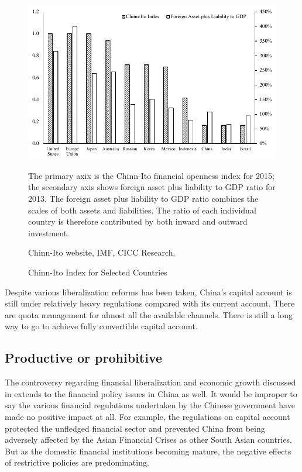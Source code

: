 \documentclass[AER]{AEA}
\begin{document}
\begin{figure}[!htb]
\centering
\includegraphics[scale=1]{fig/chinn.pdf}
\caption{Chinn-Ito Index for Selected Countries}
\begin{figurenotes}
The primary axix is the Chinn-Ito financial openness index for 2015;
the secondary axis shows foreign asset plus liability to GDP ratio for 2013. 
The foreign asset plus liability to GDP ratio combines the scales of 
both assets and liabilities. The ratio of each individual country 
is therefore contributed by both inward and outward investment. 
\end{figurenotes}
\begin{figurenotes}[Source]
Chinn-Ito website, IMF, CICC Research. 
\end{figurenotes}
\label{fig:chinn-ito}
\end{figure}

Despite various liberalization reforms has been taken, China's capital account
is still under relatively heavy regulations compared with its current account.
There are quota management for almost all the available channels.
There is still a long way to go to achieve fully convertible 
capital account. \\


\subsection{Productive or prohibitive}

The controversy regarding financial liberalization and economic growth 
discussed in  extends to the financial policy issues 
in China as well. It would be improper to say the various financial regulations 
undertaken by the Chinese government have made no positive impact at all. 
For example,  the regulations on capital account protected 
the unfledged financial sector and prevented China from being adversely affected  
by the Asian Financial Crises as other South Asian countries.
But as the domestic financial institutions becoming mature, the negative effects 
of restrictive policies are predominating. 
\end{document}
